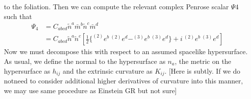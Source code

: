 \documentclass[a4paper,oneside,openany,11pt]{memoir}
\numberwithin{equation}{section} %
\newcommand{\NOTE}[1]{{\color{blue}[#1]}}
\begin{document}
to the foliation. Then we can compute the relevant complex Penrose scalar $\Psi4$ such that
\begin{align}
\Psi_4 &= C_{abcd} \tilde{n}^a \bar{m}^b \tilde{n}^c \bar{m}^d \\
           &= C_{abcd} \tilde{n}^a \tilde{n}^c \left[\frac{1}{2} \{ ^{(2)}e^b \, ^{(2)}e^d - ^{(3)}e^b \, ^{(3)}e^d  \} + i \, ^{(2)}e^b \, ^{(3)}e^d \right] 
\end{align}
Now we must decompose this with respect to an assumed spacelike hypersurface. As usual, we define the normal to the hypersurface as $n_a$, the metric on the hypersurface as $h_{ij}$ and the extrinsic curvature as $K_{ij}$.
\NOTE{Here is subtly. If we do notneed to consider additional higher derivatives of curvature into this manner, we may use same procedure as Einstein GR but not sure}



	
\end{document}
